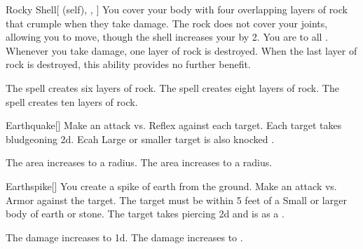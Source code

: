 \lowercase{\hypertarget{spell:Rocky Shell}{}}\label{spell:Rocky Shell}
\begin{attuneability}[Rank 2]{\hypertarget{spell:Rocky Shell}{Rocky Shell}}[ (self), , ]
You cover your body with four overlapping layers of rock that crumple when they take damage.
The rock does not cover your joints, allowing you to move, though the shell increases your  by 2.
You are  to all .
Whenever you take damage, one layer of rock is destroyed.
When the last layer of rock is destroyed, this ability provides no further benefit.

\rankline
{} The spell creates six layers of rock.
 The spell creates eight layers of rock.
 The spell creates ten layers of rock.
\end{attuneability}
\vspace{0.25em}



\lowercase{\hypertarget{spell:Earthquake}{}}\label{spell:Earthquake}
\begin{freeability}[Rank 3]{\hypertarget{spell:Earthquake}{Earthquake}}[]
Make an attack vs. Reflex against each target.
\hit Each target takes bludgeoning  \minus2d.
Ecah Large or smaller target is also knocked .

\rankline
{} The area increases to a \arealarge radius.
 The area increases to a \areahuge radius.
\end{freeability}
\vspace{0.25em}



\lowercase{\hypertarget{spell:Earthspike}{}}\label{spell:Earthspike}
\begin{freeability}[Rank 3]{\hypertarget{spell:Earthspike}{Earthspike}}[]
You create a spike of earth from the ground.
Make an attack vs. Armor against the target.
The target must be within 5 feet of a Small or larger body of earth or stone.
\hit The target takes piercing  \minus2d and is  as a .

\rankline
{} The damage increases to  \minus1d.
 The damage increases to .
\end{freeability}
\vspace{0.25em}



